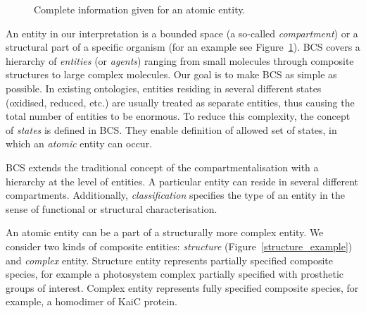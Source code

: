 \documentclass[12pt, twoside]{fithesis2} %
\begin{document}
\begin{figure}[!h]
\begin{center}
\end{center}
\caption{Complete information given for an atomic entity.}\label{entity_example}
\end{figure}

An entity in our interpretation is a bounded space (a so-called \emph{compartment}) or a structural part of a specific organism (for an example see Figure~\ref{entity_example}). BCS covers a hierarchy of \emph{entities} (or \emph{agents}) ranging from small molecules through composite structures to large complex molecules. Our goal is to make BCS as simple as possible. In existing ontologies, entities residing in several different states (oxidised, reduced, etc.) are usually treated as separate entities, thus causing the total number of entities to be enormous. To reduce this complexity, the concept of \emph{states} is defined in BCS. They enable definition of allowed set of states, in which an \emph{atomic} entity can occur.

BCS extends the traditional concept of the compartmentalisation with a hierarchy at the level of entities. A particular entity can reside in several different compartments. Additionally, \emph{classification} specifies the type of an entity in the sense of functional or structural characterisation.

An atomic entity can be a part of a structurally more complex entity. We consider two kinds of composite entities: \emph{structure} (Figure~\ref{structure_example}) and \emph{complex} entity. Structure entity represents partially specified composite species, for example a photosystem complex partially specified with prosthetic groups of interest. Complex entity represents fully specified composite species, for example, a homodimer of KaiC protein.
\end{document}
